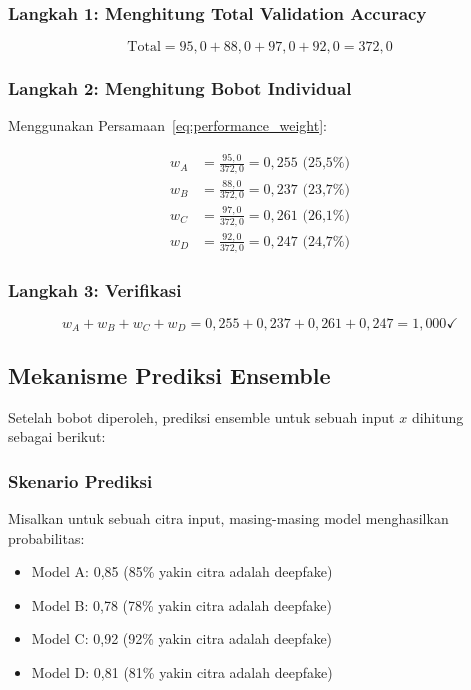 \subsubsection{Langkah 1: Menghitung Total Validation Accuracy}
$$\text{Total} = 95,0 + 88,0 + 97,0 + 92,0 = 372,0$$

\subsubsection{Langkah 2: Menghitung Bobot Individual}
Menggunakan Persamaan~\ref{eq:performance_weight}:

\begin{align}
w_A &= \frac{95,0}{372,0} = 0,255 \text{ (25,5\%)} \\
w_B &= \frac{88,0}{372,0} = 0,237 \text{ (23,7\%)} \\
w_C &= \frac{97,0}{372,0} = 0,261 \text{ (26,1\%)} \\
w_D &= \frac{92,0}{372,0} = 0,247 \text{ (24,7\%)}
\end{align}

\subsubsection{Langkah 3: Verifikasi}
$$w_A + w_B + w_C + w_D = 0,255 + 0,237 + 0,261 + 0,247 = 1,000 \checkmark$$

\subsection{Mekanisme Prediksi Ensemble}

Setelah bobot diperoleh, prediksi ensemble untuk sebuah input $x$ dihitung sebagai berikut:

\subsubsection{Skenario Prediksi}
Misalkan untuk sebuah citra input, masing-masing model menghasilkan probabilitas:
\begin{itemize}
    \item Model A: 0,85 (85\% yakin citra adalah deepfake)
    \item Model B: 0,78 (78\% yakin citra adalah deepfake)
    \item Model C: 0,92 (92\% yakin citra adalah deepfake)
    \item Model D: 0,81 (81\% yakin citra adalah deepfake)
\end{itemize}

